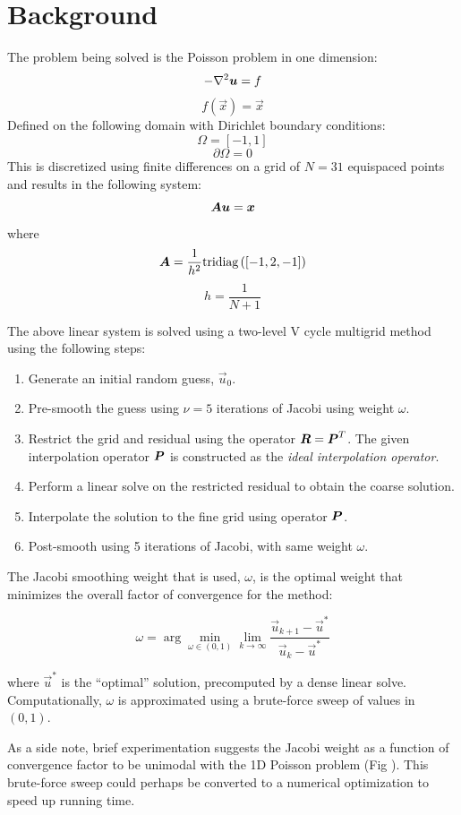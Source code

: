 


\section{Background}
The problem being solved is the Poisson problem in one dimension:
$$ -\nabla^2\bm{{u}} = f $$
$$ f(\vec{x}) = \vec{x} $$
Defined on the following domain with Dirichlet boundary conditions:
$$ \Omega = \left[-1, 1\right]$$
$$ \partial\Omega = 0 $$
This is discretized using finite differences on a grid of $N=31$ equispaced points and results in the following system:
$$ \bm{{A}}\bm{{u}} = \bm{{x}} $$
where
$$\bm{{A}} = \frac{1}{h^2} \text{tridiag}\left(\left[-1, 2, -1\right]\right)$$
$$h = \frac{1}{N+1}$$

The above linear system is solved using a two-level V cycle multigrid method using the following steps:

\begin{enumerate}
\item Generate an initial random guess, $\vec{u}_0$.
\item Pre-smooth the guess using $\nu=5$ iterations of Jacobi using weight $\omega$.
\item Restrict the grid and residual using the operator $\bm{{R}}=\bm{{P}}^T$.  The given interpolation operator $\bm{{P}}$ is constructed as the \textit{ideal interpolation operator}.
\item Perform a linear solve on the restricted residual to obtain the coarse solution.
\item Interpolate the solution to the fine grid using operator $\bm{{P}}$.
\item Post-smooth using 5 iterations of Jacobi, with same weight $\omega$.
\end{enumerate}

The Jacobi smoothing weight that is used, $\omega$, is the optimal weight that minimizes the overall factor of convergence for the method:

$$\omega = \arg \min_{\omega\in\left(0,1\right)} \lim_{k\to\infty} \frac{ \vec{u}_{k+1} - \vec{u}^* }{ \vec{u}_{k} - \vec{u}^* }$$

where $\vec{u}^*$ is the ``optimal'' solution, precomputed by a dense linear solve.  Computationally, $\omega$ is approximated using a brute-force sweep of values in $\left(0, 1\right) $.

As a side note, brief experimentation suggests the Jacobi weight as a function of convergence factor to be unimodal with the 1D Poisson problem (Fig ).  This brute-force sweep could perhaps be converted to a numerical optimization to speed up running time.

